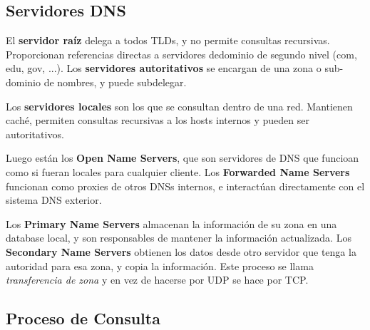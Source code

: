 \subsection{Servidores DNS}

El \textbf{servidor raíz} delega a todos TLDs, y no permite consultas recursivas. Proporcionan referencias directas a servidores dedominio de segundo nivel (com, edu, gov, ...). Los \textbf{servidores autoritativos} se encargan de una zona o sub-dominio de nombres, y puede subdelegar.

Los \textbf{servidores locales} son los que se consultan dentro de una red. Mantienen caché, permiten consultas recursivas a los hosts internos y pueden ser autoritativos. 

Luego están los \textbf{Open Name Servers}, que son servidores de DNS que funcioan como si fueran locales para cualquier cliente. Los \textbf{Forwarded Name Servers} funcionan como proxies de otros DNSs internos, e interactúan directamente con el sistema DNS exterior.

Los \textbf{Primary Name Servers} almacenan la información de su zona en una database local, y son responsables de mantener la información actualizada. Los \textbf{Secondary Name Servers} obtienen los datos desde otro servidor que tenga la autoridad para esa zona, y copia la información. Este proceso se llama \emph{transferencia de zona} y en vez de hacerse por UDP se hace por TCP.

\subsection{Proceso de Consulta}

